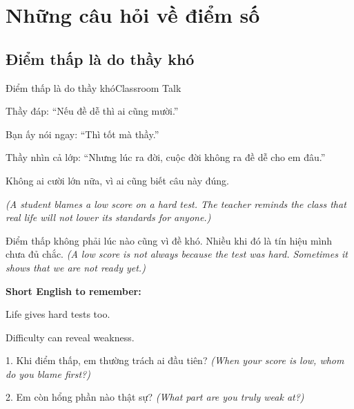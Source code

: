 \chapter{Những câu hỏi về điểm số}

\section{Điểm thấp là do thầy khó}
\begin{truyen}{Điểm thấp là do thầy khó}{Classroom Talk}

Thầy đáp: ``Nếu đề dễ thì ai cũng mười.''

Bạn ấy nói ngay: ``Thì tốt mà thầy.''

Thầy nhìn cả lớp: ``Nhưng lúc ra đời, cuộc đời không ra đề dễ cho em đâu.''

Không ai cười lớn nữa, vì ai cũng biết câu này đúng.

\textit{(A student blames a low score on a hard test. The teacher reminds the class that real life will not lower its standards for anyone.)}
\end{truyen}

\begin{baihoc}
Điểm thấp không phải lúc nào cũng vì đề khó. Nhiều khi đó là tín hiệu mình chưa đủ chắc.
\textit{(A low score is not always because the test was hard. Sometimes it shows that we are not ready yet.)}
\end{baihoc}

\begin{ghinhoanh}
\textbf{Short English to remember:}

Life gives hard tests too.

Difficulty can reveal weakness.
\end{ghinhoanh}

\begin{tuhocnhanh}
1. Khi điểm thấp, em thường trách ai đầu tiên? \textit{(When your score is low, whom do you blame first?)}

2. Em còn hổng phần nào thật sự? \textit{(What part are you truly weak at?)}
\end{tuhocnhanh}
\ngancach

